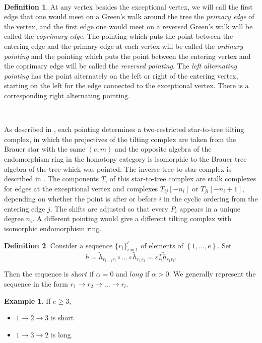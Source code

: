 \documentclass[11pt,english]{article}
\numberwithin{figure}{section}
\numberwithin{equation}{section}
\numberwithin{table}{section}
\theoremstyle{definition}
\newtheorem{defn}{Definition}[section]
\newtheorem{examp}{Example}
\theoremstyle{remark}
\begin{document}
~
\noindent \begin{defn}
	At any vertex besides the exceptional vertex, we will call the first edge that one
	would meet on a Green's walk around the tree the \textit{ primary edge
	}of the vertex, and the first edge one would meet on a 
	reversed Green's walk will be called the \textit{coprimary edge}.
	The pointing which puts the point between the entering edge and the 
	primary edge at each vertex will be called the \textit{ordinary pointing}
	and the pointing which puts the point between the entering vertex and
	the coprimary edge will be called the  \textit{reversed pointing}.
	The \textit{left alternating pointing} has the point alternately on the left
	or right of the entering vertex, starting on the left for the edge connected 
	to the exceptional vertex. There is a corresponding right alternating pointing.
\end{defn} 

~

\noindent As described in \cite{SZ2}, each pointing determines a two-restricted star-to-tree tilting 
complex, in which the projectives of the tilting complex are taken from the 
Brauer star with the same $(e,m)$ and the opposite algebra of the 
endomorphism ring in the homotopy category is isomorphic to the Brauer tree algebra of the tree 
which was pointed. The inverse tree-to-star complex is described in \cite{RS}. The components $T_i$ of this star-to-tree
complex are stalk complexes for edges at the exceptional vertex
and complexes  $T_{ij}[-n_i]$ or $T_{ji}[-n_i+1]$, depending on 
whether the point is after or before $i$ in the cyclic ordering from the entering 
edge $j$. The shifts are adjusted so that every $P_i$ appears in a unique degree $n_i$. A different pointing would give a different tilting complex 
with isomorphic endomorphism ring.


\noindent \begin{defn}Consider a sequence $\{r_i\}_{i=1}^{l}$ of elements
	of $\left\{ 1,...,e\right\} $. Set
	\[
	h=\widetilde{h}_{r_{l-1}r_{l}}\circ...\circ\widetilde{h}_{r_{1}r_{2}}=\varepsilon_{r_{l}}^{\alpha}\widetilde{h}_{r_{1}r_{l}}.
	\]
	
	
	\noindent Then the sequence is $\textit{short}$ if $\alpha=0$ and
	$\textit{long}$ if $\alpha>0$. We generally represent the sequence
	in the form $r_{1}\rightarrow r_{2}\rightarrow...\rightarrow r_{l}$.\end{defn}

\noindent \begin{examp}If $e \geq 3$,
	\begin{itemize}
		\item $1\rightarrow 2\rightarrow 3$ is short
		\item $1\rightarrow 3\rightarrow 2$ is long.
	\end{itemize}
	\noindent \end{examp}
\end{document}
